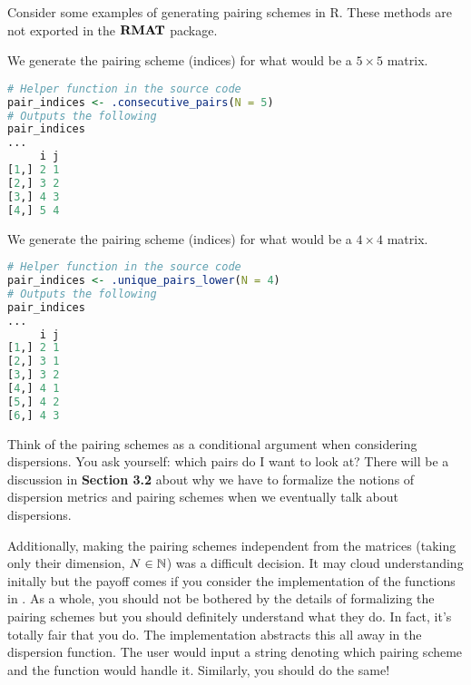 
\noindent Consider some examples of generating pairing schemes in R. These methods are
not exported in the ${\textbf{RMAT}}$ package.

\begin{code}
  We generate the pairing scheme (indices) for what would be a $5 \times 5$ matrix.
\end{code}
\begin{lstlisting}[language=R]
# Helper function in the source code
pair_indices <- .consecutive_pairs(N = 5)
# Outputs the following
pair_indices
...
     i j
[1,] 2 1
[2,] 3 2
[3,] 4 3
[4,] 5 4
\end{lstlisting}

\begin{code}
  We generate the pairing scheme (indices) for what would be a $4 \times 4$ matrix.
\end{code}
\begin{lstlisting}[language=R]
# Helper function in the source code
pair_indices <- .unique_pairs_lower(N = 4)
# Outputs the following
pair_indices
...
     i j
[1,] 2 1
[2,] 3 1
[3,] 3 2
[4,] 4 1
[5,] 4 2
[6,] 4 3
\end{lstlisting}

Think of the pairing schemes as a conditional argument when considering dispersions. You ask yourself: which pairs do I want to look at? There will be a discussion in \textbf{Section 3.2} about why we have to formalize the notions of dispersion metrics and pairing schemes when we eventually talk about dispersions.

Additionally, making the pairing schemes independent from the matrices (taking only their dimension, $N \in \mathbb{N}$) was a difficult decision. It may cloud understanding initally but the payoff comes if you consider the implementation of the functions in \RMAT. As a whole, you should not be bothered by the details of formalizing the pairing schemes but you should definitely understand what they do. In fact, it's totally fair that you do. The \RMAT \; implementation abstracts this all away in the dispersion function. The user would input a string denoting which pairing scheme and the function would handle it. Similarly, you should do the same!

%

